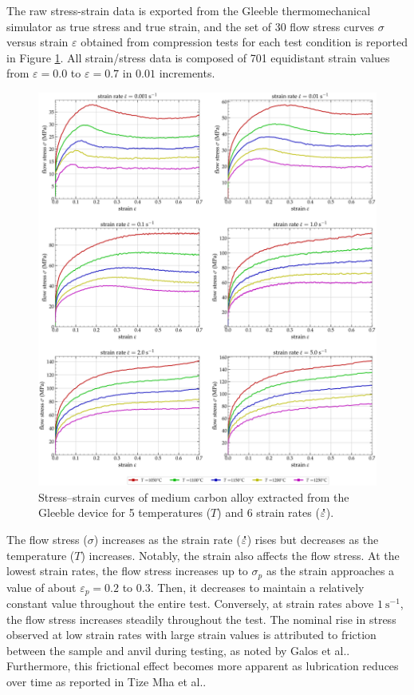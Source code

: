\documentclass[metals,article,submit,pdftex,moreauthors]{Definitions/mdpi}
\makeatletter
\DeclareRobustCommand{\mdot}[1]{\accentset{\mbox{\bfseries .}}{#1}}
\DeclareRobustCommand{\eal}{et al.\@\xspace}
\DeclareRobustCommand{\ps}{\text{s}^{-1}}
\makeatother
\begin{document}
The raw stress-strain data is exported from the Gleeble thermomechanical simulator as true stress and true strain, and the set of 30 flow stress curves $\sigma$ versus strain $\varepsilon$ obtained from compression tests for each test condition is reported in Figure \ref{fig:RawData}.
All strain/stress data is composed of 701 equidistant strain values from $\varepsilon=0.0$ to $\varepsilon=0.7$ in $0.01$ increments.
\begin{figure}[H]
\centering
\includegraphics[width=0.9\columnwidth]{Figures/rawData}
\caption{Stress--strain curves of medium carbon alloy extracted from the Gleeble device for 5 temperatures ($T$) and 6 strain rates ($\mdot\varepsilon$).}
\label{fig:RawData}
\end{figure}

The flow stress ($\sigma$) increases as the strain rate ($\mdot\varepsilon$) rises but decreases as the temperature ($T$) increases.
Notably, the strain also affects the flow stress.
At the lowest strain rates, the flow stress increases up to $\sigma_p$ as the strain approaches a value of about $\varepsilon_p=0.2$ to $0.3$.
Then, it decreases to maintain a relatively constant value throughout the entire test.
Conversely, at strain rates above $1~\ps$, the flow stress increases steadily throughout the test.
The nominal rise in stress observed at low strain rates with large strain values is attributed to friction between the sample and anvil during testing, as noted by Galos \eal \cite{Galos-2022}.
Furthermore, this frictional effect becomes more apparent as lubrication reduces over time as reported in Tize Mha \eal \cite{TizeMha-2023}.
\end{document}
